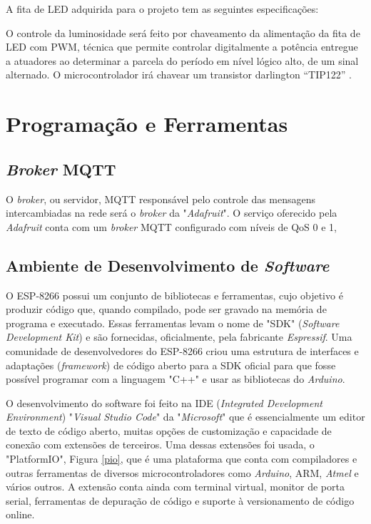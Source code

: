 
A fita de LED adquirida para o projeto tem as seguintes especificações:


O controle da luminosidade será feito por chaveamento da alimentação da fita de LED com \acf{PWM}, técnica que permite controlar digitalmente a potência entregue a atuadores ao determinar a parcela do período em nível lógico alto, de um sinal alternado. O microcontrolador irá chavear um transistor darlington “TIP122” \cite{tip122}.

\section{Programação e Ferramentas}

\subsection{\textit{Broker} MQTT}

O \textit{broker}, ou servidor, MQTT responsável pelo controle das mensagens intercambiadas na rede será o \textit{broker} da "\textit{Adafruit}". O serviço oferecido pela \textit{Adafruit} conta com um  \textit{broker} MQTT configurado com níveis de QoS 0 e 1, 

\subsection{Ambiente de Desenvolvimento de \textit{Software}}

O ESP-8266 possui um conjunto de bibliotecas e ferramentas, cujo objetivo é produzir código que, quando compilado, pode ser gravado na memória de programa e executado. Essas ferramentas levam o nome de "SDK" (\textit{Software Development Kit}) e são fornecidas, oficialmente, pela fabricante \textit{Espressif}. Uma comunidade de desenvolvedores do ESP-8266 criou uma estrutura de interfaces e adaptações (\textit{framework}) de código aberto para a SDK oficial para que fosse possível programar com a linguagem "C++" e usar as bibliotecas do \textit{Arduino}.

O desenvolvimento do software foi feito na IDE (\textit{Integrated Development Environment}) "\textit{Visual Studio Code}" da "\textit{Microsoft}" que é essencialmente um editor de texto de código aberto, muitas opções de customização e capacidade de conexão com extensões de terceiros. Uma dessas extensões foi usada, o "PlatformIO", Figura \ref{pio}, que é uma plataforma que conta com compiladores e outras ferramentas de diversos microcontroladores como \textit{Arduino}, ARM, \textit{Atmel} e vários outros. A extensão conta ainda com terminal virtual, monitor de porta serial, ferramentas de depuração de código e suporte à versionamento de código online.


